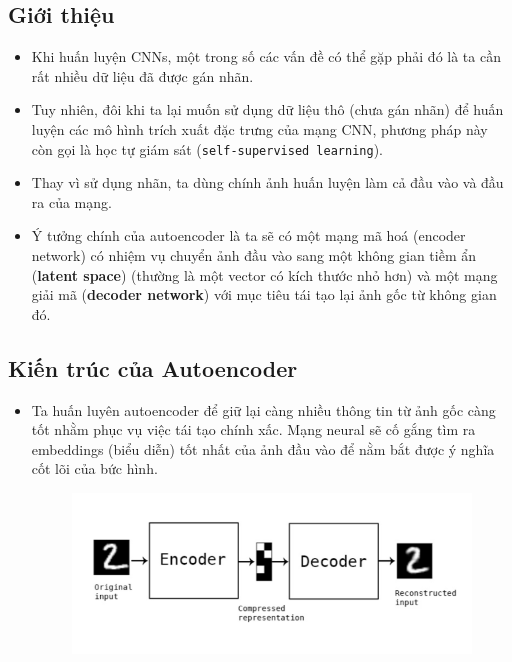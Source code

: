 \documentclass{book}
\begin{document}
\subsection{Giới thiệu}
\begin{itemize}
	\item Khi huấn luyện CNNs, một trong số các vấn đề có thể gặp phải đó là ta cần rất nhiều dữ liệu đã được gán nhãn.
	\item Tuy nhiên, đôi khi ta lại muốn sử dụng dữ liệu thô (chưa gán nhãn) để huấn luyện các mô hình trích xuất đặc trưng của mạng CNN, phương pháp này còn gọi là học tự giám sát (\texttt{self-supervised learning}).
	\item Thay vì sử dụng nhãn, ta dùng chính ảnh huấn luyện làm cả đầu vào và đầu ra của mạng.
	\item Ý tưởng chính của autoencoder là ta sẽ có một mạng mã hoá (encoder network) có nhiệm vụ chuyển ảnh đầu vào sang một không gian tiềm ẩn (\textbf{latent space}) (thường là một vector có kích thước nhỏ hơn) và một mạng giải mã (\textbf{decoder network}) với mục tiêu tái tạo lại ảnh gốc từ không gian đó. 
\end{itemize}

\subsection{Kiến trúc của Autoencoder}
\begin{itemize}
	\item Ta huấn luyên autoencoder để giữ lại càng nhiều thông tin từ ảnh gốc càng tốt nhằm phục vụ việc tái tạo chính xấc. Mạng neural sẽ cố gắng tìm ra embeddings (biểu diễn) tốt nhất của ảnh đầu vào để nằm bắt được ý nghĩa cốt lõi của bức hình.
	\begin{figure}[H]
		\centering
		\includegraphics[width=0.75\linewidth]{images/au1.png}
	\end{figure}
\end{itemize}
\end{document}
